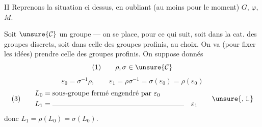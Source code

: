 


II Reprenons la situation ci dessus, en oubliant (au moins pour le moment) $G$, $\varphi$, $M$.


Soit $\unsure{\mathcal{C}}$ un groupe --- on se place, pour ce qui suit, soit dans la cat. des groupes discrets, soit dans celle des groupes profinis, au choix. On va (pour fixer les idées) prendre celle des groupes profinis. On suppose donnés
\[
(1)\qquad \rho,\sigma\in\unsure{\mathcal{C}}
\]
\margin{[\unsure{i.e. on a entre} $\varepsilon_0=\ell'_0$, $\sigma=\ell'_1$ \inserted{\unsure{ou pour}} et $\rho^{-1}=\ell'_\infty$ avec relation (2) $\ell'_\infty\ell'_1\ell'_0=1$]}
\[
\varepsilon_0=\sigma^{-1}\rho,\qquad
\varepsilon_1=\rho\sigma^{-1}=\sigma(\varepsilon_0)=\rho(\varepsilon_0)
\]
\[
(3)\qquad
\begin{aligned}
L_0&=\text{sous-groupe fermé engendré par }\varepsilon_0\\
L_1&=\rule{6.5cm}{0.3pt}\quad\varepsilon_1
\end{aligned}
\qquad\unsure{\text{, i.}}
\]
donc $L_1=\rho(L_0)=\sigma(L_0)$.

